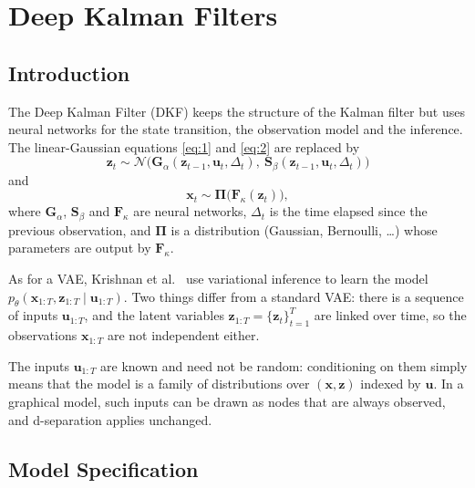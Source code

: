 \chapter{Deep Kalman Filters}\label{chap:dkf}

\section{Introduction}

The Deep Kalman Filter (DKF) keeps the structure of the Kalman filter but
uses neural networks for the state transition, the observation model and
the inference. The linear-Gaussian equations \eqref{eq:1} and
\eqref{eq:2} are replaced by
\begin{equation}
    \mathbf{z}_t \sim \mathcal{N}\big(\mathbf{G}_{\alpha}(\mathbf{z}_{t-1},
    \mathbf{u}_t, \Delta_{t}),\ \mathbf{S}_{\beta}(\mathbf{z}_{t-1},
    \mathbf{u}_t, \Delta_{t})\big)
    \label{eq:3}
\end{equation}
and
\begin{equation}
    \mathbf{x}_t \sim \mathbf{\Pi}\big(\mathbf{F}_{\kappa}(\mathbf{z}_{t})
    \big),
    \label{eq:4}
\end{equation}
where $\mathbf{G}_{\alpha}$, $\mathbf{S}_{\beta}$ and
$\mathbf{F}_{\kappa}$ are neural networks, $\Delta_t$ is the time elapsed
since the previous observation, and $\mathbf{\Pi}$ is a distribution
(Gaussian, Bernoulli, \ldots) whose parameters are output by
$\mathbf{F}_{\kappa}$.

As for a VAE, Krishnan et al.\ \cite{krishnan2015deep} use variational
inference to learn the model
$p_{\theta}(\mathbf{x}_{1:T}, \mathbf{z}_{1:T} \mid \mathbf{u}_{1:T})$.
Two things differ from a standard VAE: there is a sequence of inputs
$\mathbf{u}_{1:T}$, and the latent variables
$\mathbf{z}_{1:T} = \{\mathbf{z}_{t}\}_{t=1}^{T}$ are linked over time,
so the observations $\mathbf{x}_{1:T}$ are not independent either.

\begin{story}
The inputs $\mathbf{u}_{1:T}$ are known and need not be random:
conditioning on them simply means that the model is a family of
distributions over $(\mathbf{x}, \mathbf{z})$ indexed by $\mathbf{u}$. In
a graphical model, such inputs can be drawn as nodes that are always
observed, and d-separation applies unchanged.
\end{story}

\section{Model Specification}

